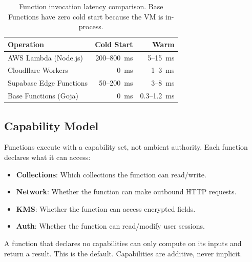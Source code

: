\begin{table}[H]
\centering
\small
\begin{tabular}{lrr}
\toprule
\textbf{Operation} & \textbf{Cold Start} & \textbf{Warm} \\
\midrule
AWS Lambda (Node.js) & 200--800~ms & 5--15~ms \\
Cloudflare Workers & 0~ms & 1--3~ms \\
Supabase Edge Functions & 50--200~ms & 3--8~ms \\
Base Functions (Goja) & 0~ms & 0.3--1.2~ms \\
\bottomrule
\end{tabular}
\caption{Function invocation latency comparison. Base Functions have zero cold start because the VM is in-process.}
\label{tab:coldstart}
\end{table}

\subsection{Capability Model}

Functions execute with a capability set, not ambient authority. Each function
declares what it can access:

\begin{itemize}[leftmargin=1.1em]
    \item \textbf{Collections}: Which collections the function can read/write.
    \item \textbf{Network}: Whether the function can make outbound HTTP requests.
    \item \textbf{KMS}: Whether the function can access encrypted fields.
    \item \textbf{Auth}: Whether the function can read/modify user sessions.
\end{itemize}

A function that declares no capabilities can only compute on its inputs and
return a result. This is the default. Capabilities are additive, never
implicit.

